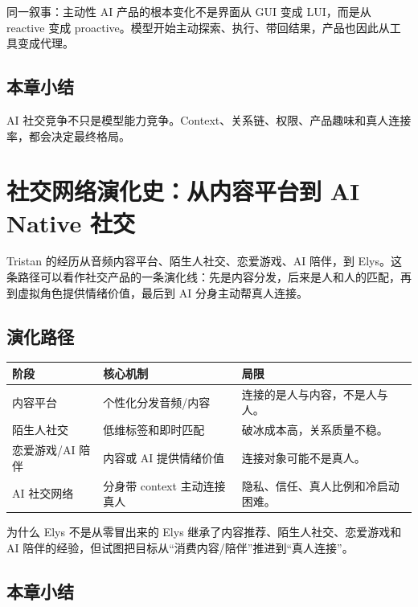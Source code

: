 \documentclass[a4paper]{article}
\begin{document}
\begin{importantbox}{同一叙事：主动性}
AI 产品的根本变化不是界面从 GUI 变成 LUI，而是从 reactive 变成 proactive。模型开始主动探索、执行、带回结果，产品也因此从工具变成代理。
\end{importantbox}

\subsection{本章小结}

AI 社交竞争不只是模型能力竞争。Context、关系链、权限、产品趣味和真人连接率，都会决定最终格局。

\section{社交网络演化史：从内容平台到 AI Native 社交}

Tristan 的经历从音频内容平台、陌生人社交、恋爱游戏、AI 陪伴，到 Elys。这条路径可以看作社交产品的一条演化线：先是内容分发，后来是人和人的匹配，再到虚拟角色提供情绪价值，最后到 AI 分身主动帮真人连接。

\subsection{演化路径}

\noindent\begin{longtable}{p{}p{}p{}}
\toprule
阶段 & 核心机制 & 局限 \\
\midrule
内容平台 & 个性化分发音频/内容 & 连接的是人与内容，不是人与人。 \\
陌生人社交 & 低维标签和即时匹配 & 破冰成本高，关系质量不稳。 \\
恋爱游戏/AI 陪伴 & 内容或 AI 提供情绪价值 & 连接对象可能不是真人。 \\
AI 社交网络 & 分身带 context 主动连接真人 & 隐私、信任、真人比例和冷启动困难。 \\
\bottomrule
\end{longtable}

\begin{knowledgebox}{为什么 Elys 不是从零冒出来的}
Elys 继承了内容推荐、陌生人社交、恋爱游戏和 AI 陪伴的经验，但试图把目标从“消费内容/陪伴”推进到“真人连接”。
\end{knowledgebox}

\subsection{本章小结}
\end{document}

